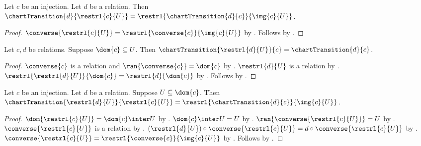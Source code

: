 \begin{theorem}\label{chart_transition_source_restriction}
    Let $c$ be an injection.
    Let $d$ be a relation.
    Then $\chartTransition{d}{\restrl{c}{U}}
        =\restrl{\chartTransition{d}{c}}{\img{c}{U}}$.
\end{theorem}
\begin{proof}
    $\converse{\restrl{c}{U}}=\restrl{\converse{c}}{\img{c}{U}}$ by .
    Follows by .
\end{proof}

\begin{theorem}\label{chart_transition_target_restriction}
    Let $c,d$ be relations.
    Suppose $\dom{c}\subseteq U$.
    Then $\chartTransition{\restrl{d}{U}}{c}=\chartTransition{d}{c}$.
\end{theorem}
\begin{proof}
    $\converse{c}$ is a relation and $\ran{\converse{c}}=\dom{c}$ by
        .
    $\restrl{d}{U}$ is a relation by .
    $\restrl{\restrl{d}{U}}{\dom{c}}=\restrl{d}{\dom{c}}$ by .
    Follows by .
\end{proof}

\begin{theorem}\label{chart_transition_restriction}
    Let $c$ be an injection.
    Let $d$ be a relation.
    Suppose $U\subseteq\dom{c}$.
    Then $\chartTransition{\restrl{d}{U}}{\restrl{c}{U}}
        =\restrl{\chartTransition{d}{c}}{\img{c}{U}}$.
\end{theorem}
\begin{proof}
    $\dom{\restrl{c}{U}}=\dom{c}\inter U$ by .
    $\dom{c}\inter U=U$ by .
    $\ran{\converse{\restrl{c}{U}}}=U$ by .
    $\converse{\restrl{c}{U}}$ is a relation by .
    $(\restrl{d}{U})\circ\converse{\restrl{c}{U}}
        =d\circ\converse{\restrl{c}{U}}$ by .
    $\converse{\restrl{c}{U}}=\restrl{\converse{c}}{\img{c}{U}}$ by .
    Follows by .
\end{proof}

